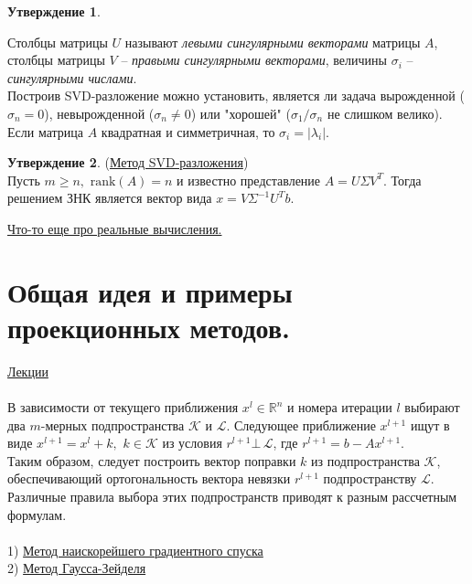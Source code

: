 \documentclass[specialist, subf, href, colorlinks=true, 12pt, times, mtpro, final]{disser}
\theoremstyle{definition}
\newtheorem{state}{Утверждение}[section]
\def\rk{\text{rank}}
\begin{document}
{\begin{state}
    \end{state}
    Столбцы матрицы $U$ называют {\it левыми сингулярными векторами} матрицы $A$, столбцы
    матрицы $V$ --  {\it правыми сингулярными векторами}, величины $\sigma_i$ --
    {\it сингулярными числами}.\\
    Построив SVD-разложение можно установить, является ли задача вырожденной ($\sigma_n=0$),
    невырожденной ($\sigma_n $) или "хорошей"{} ($\sigma_1 / \sigma_n$ не слишком
    велико). Если матрица $A$ квадратная и симметричная, то $\sigma_i = |\lambda_i|$.
    \begin{state} (\hyperlink {lects.73}{Метод SVD-разложения})\\
    Пусть $m \ge n, \,\, \rk(A) = n$ и известно представление $A = U\Sigma V^T$.
    Тогда решением ЗНК является вектор вида $x = V\Sigma^{-1}U^T b$.
    \end{state}
    \hyperlink {lects.73}{Что-то еще про реальные вычисления.}

\section {Общая идея и примеры проекционных методов.}
    \hyperlink {lects.74}{Лекции}\\
    \\
    В зависимости от текущего приближения $x^l \in {}^n$ и номера итерации $l$
    выбирают два $m$-мерных подпространства $$ и $$. Следующее
    приближение $x^{l+1}$ ищут в виде $x^{l+1} = x^l + k, \,\, k\in {}$ из
    условия $r^{l+1} \bot\, $, где $r^{l+1} = b - Ax^{l+1}$.\\
    Таким образом, следует построить вектор поправки $k$ из подпространства $$,
    обеспечивающий ортогональность вектора невязки $r^{l+1}$ подпространству $$.
    Различные правила выбора этих подпространств приводят к разным рассчетным формулам.\\
    \\
    1) \hyperlink {lects.74}{Метод наискорейшего градиентного спуска}\\
    2) \hyperlink {lects.74}{Метод Гаусса-Зейделя}

}
\end{document}
